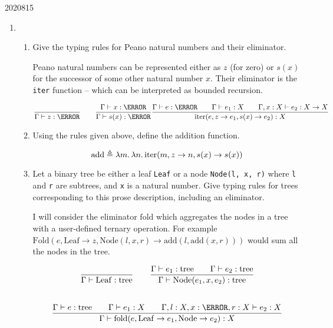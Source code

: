 \documentclass[10pt,\jkfside,a4paper]{article}
\begin{document}
\begin{enumerate}
\begin{examquestion}{2020}{8}{15}
\begin{enumerate}[label=(\textit{\alph*})]
            \item

            \begin{enumerate}[label=(\roman*)]

                \item Give the typing rules for Peano natural numbers and their eliminator.

                Peano natural numbers can be represented either as $z$ (for zero) or $s(x)$ for the successor of some other natural number $x$. Their eliminator is the \texttt{iter} function -- which can be
                interpreted as bounded recursion.

                \[
                    \dfrac{}{\Gamma \vdash z: \N} \qquad \dfrac{\Gamma \vdash x: \N}{\Gamma \vdash s(x): \N} \\
                    \dfrac{\Gamma \vdash e: \N \qquad \Gamma \vdash e_1: X \qquad \Gamma, x: X \vdash e_2: X \to X}{\mathrm{iter}(e, z \to e_1, s(x) \to e_2): X}
                \]

                \item Using the rules given above, define the addition function.

                \[
                    \mathrm{add} \triangleq \lambda m\ldotp \lambda n\ldotp \mathrm{iter}(m, z \to n, s(x) \to s(x))
                \]

                \item Let a binary tree be either a leaf \texttt{Leaf} or a node \texttt{Node(l, x, r)} where \texttt{l} and \texttt{r} are subtrees, and \texttt{x} is a natural number. Give typing rules for trees
                corresponding to this prose description, including an eliminator.

                I will consider the eliminator $\mathrm{fold}$ which aggregates the nodes in a tree with a user-defined ternary operation.
                For example $\mathrm{Fold}(e, \mathrm{Leaf} \to z, \mathrm{Node}(l, x, r) \to \mathrm{add}(l, \mathrm{add}(x, r)))$ would sum all the nodes in the tree.

                \begin{gather*}
                    \dfrac{}{\Gamma \vdash \mathrm{Leaf}: \mathrm{tree}} \qquad
                    \dfrac{\Gamma \vdash e_1: \mathrm{tree} \qquad \Gamma \vdash e_2: \mathrm{tree}}{\Gamma \vdash \mathrm{Node}(e_1, x, e_2): \mathrm{tree}} \\[2em]
                    \dfrac{\Gamma \vdash e: \mathrm{tree} \qquad \Gamma \vdash e_1: X \qquad \Gamma, l: X, x: \N, r: X \vdash e_2: X}{\Gamma \vdash \mathrm{fold}(e, \mathrm{Leaf} \to e_1, \mathrm{Node} \to e_2): X}
                \end{gather*}


\end{enumerate}
\end{enumerate}
\end{examquestion}
\end{enumerate}
\end{document}
